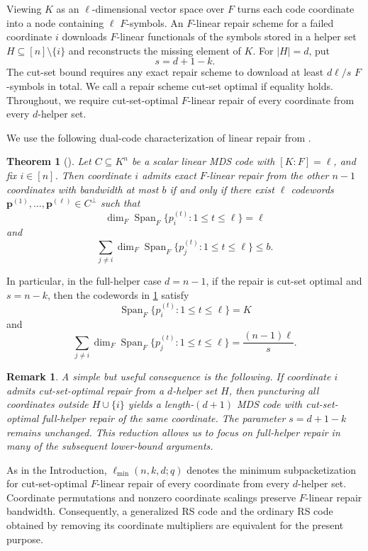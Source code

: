 \documentclass[11pt,onecolumn]{IEEEtran}
\newtheorem{theorem}{Theorem}
\newtheorem{remark}{Remark}
\newcommand{\Span}{\operatorname{Span}}
\newcommand{\ellmin}{\ell_{\min}}
\begin{document}
Viewing $K$ as an $\ell$-dimensional vector space over $F$ turns each
code coordinate into a node containing $\ell$ $F$-symbols. An
$F$-linear repair scheme for a failed coordinate $i$ downloads
$F$-linear functionals of the symbols stored in a helper set
$H\subseteq[n]\setminus\{i\}$ and reconstructs the missing element of
$K$. For $|H|=d$, put
\[
s=d+1-k.
\]
The cut-set bound requires any exact repair scheme to download at
least $d\ell/s$ $F$-symbols in total. We call a repair scheme
cut-set optimal if equality holds. Throughout, we require
cut-set-optimal $F$-linear repair of every coordinate from every
$d$-helper set.

We use the following dual-code characterization of linear repair
from \cite[Theorem~4]{GW2017}.

\begin{theorem}[{\cite[Theorem~4]{GW2017}}]
\label{thm:GW}
Let $C\subseteq K^n$ be a scalar linear MDS code with $[K:F]=\ell$,
and fix $i\in[n]$. Then coordinate $i$ admits exact $F$-linear repair
from the other $n-1$ coordinates with bandwidth at most $b$ if and
only if there exist $\ell$ codewords
$\bm p^{(1)},\ldots,\bm p^{(\ell)}\in C^\perp$ such that
\[
\dim_F\Span_F\{p_i^{(t)}:1\le t\le\ell\}
=
\ell
\]
and
\[
\sum_{j\ne i}
\dim_F\Span_F\{p_j^{(t)}:1\le t\le\ell\}
\le b.
\]
\end{theorem}

In particular, in the full-helper case $d=n-1$, if the repair is
cut-set optimal and $s=n-k$, then the codewords in
\cref{thm:GW} satisfy
\[
\Span_F\{p_i^{(t)}:1\le t\le\ell\}=K
\]
and
\[
\sum_{j\ne i}
\dim_F\Span_F\{p_j^{(t)}:1\le t\le\ell\}
=
\frac{(n-1)\ell}{s}.
\]


\begin{remark}A simple but useful consequence is the following. If coordinate $i$
admits cut-set-optimal repair from a $d$-helper set $H$,
then puncturing all coordinates outside $H\cup\{i\}$ yields a length-$(d+1)$ MDS
code with cut-set-optimal full-helper repair of the same coordinate.
The parameter $s=d+1-k$ remains unchanged.  This reduction allows us
to focus on full-helper repair in many of the subsequent lower-bound
arguments.
\end{remark}


As in the Introduction, $\ellmin(n,k,d;q)$ denotes the
minimum subpacketization for cut-set-optimal $F$-linear repair
of every coordinate from every $d$-helper set. Coordinate permutations
and nonzero coordinate scalings preserve $F$-linear repair bandwidth.
Consequently, a generalized RS code and the ordinary RS code obtained
by removing its coordinate multipliers are equivalent for the present
purpose.
\end{document}
